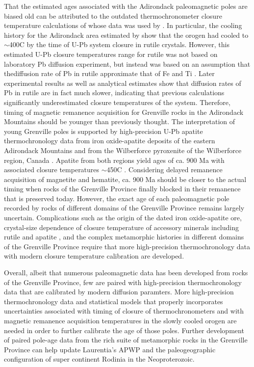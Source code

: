 \documentclass[draft]{agujournal2019}
\begin{document}
That the estimated ages associated with the Adirondack paleomagnetic poles are biased old can be attributed to the outdated thermochronometer closure temperature calculations of  whose data was used by . In particular, the cooling history for the Adirondack area estimated by  show that the orogen had cooled to $\sim$400\textdegree C by the time of U-Pb system closure in rutile crystals. However, this estimated U-Pb closure temperatures range for rutile was not based on laboratory Pb diffusion experiment, but instead was based on an assumption that thediffusion rate of Pb in rutile approximate that of Fe and Ti \cite{Mezger1989a}. Later experimental results \cite{Cherniak2000a} as well as analytical estimates \cite{Vry2006a, Kooijman2010a} show that diffusion rates of Pb in rutile are in fact much slower, indicating that previous calculations significantly underestimated closure temperatures of the system. Therefore, timing of magnetic remanence acquisition for Grenville rocks in the Adirondack Mountains should be younger than previously thought. 
The interpretation of young Grenville poles is supported by high-precision U-Pb apatite thermochronology data from iron oxide-apatite deposits of the eastern Adirondack Mountains \cite{Krestianinov2021a} and from the Wilberforce pyroxenite of the Wilberforce region, Canada \cite{Paul2021a}. Apatite from both regions yield ages of ca. 900 Ma with associated closure temperatures $\sim$450\textdegree C \cite{Cherniak1991a, Chamberlain2001a}. Considering delayed remanence acquisition of magnetite and hematite, ca. 900 Ma should be closer to the actual timing when rocks of the Grenville Province finally blocked in their remanence that is preserved today. However, the exact age of each paleomagnetic pole recorded by rocks of different domains of the Grenville Province remains largely uncertain. Complications such as the origin of the dated iron oxide-apatite ore, crystal-size dependence of closure temperature of accessory minerals including rutile and apatite \cite{Smye2018a, Chamberlain2001a}, and the complex metamorphic histories in different domains of the Grenville Province require that more high-precision thermochronology data with modern closure temperature calibration are developed. 

Overall, albeit that numerous paleomagnetic data has been developed from rocks of the Grenville Province, few are paired with high-precision thermochronology data that are calibrated by modern diffusion paramters. More high-precision thermochronology data and statistical models that properly incorporates uncertainties associated with timing of closure of thermochronometers and with magnetic remanence acquisition temperatures in the slowly cooled orogen are needed in order to further calibrate the age of those poles. Further development of paired pole-age data from the rich suite of metamorphic rocks in the Grenville Province can help update Laurentia's APWP \cite{Irving1974a} and the paleogeographic configuration of super continent Rodinia in the Neoproterozoic.  
\end{document}
